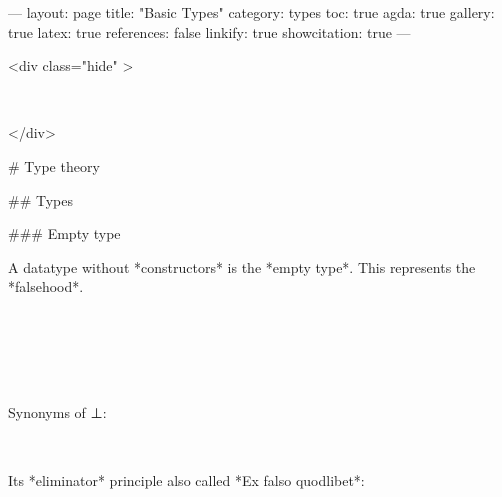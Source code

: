 ---
layout: page
title: "Basic Types"
category: types
toc: true
agda: true
gallery: true
latex: true
references: false
linkify: true
showcitation: true
---

<div class="hide" >
\begin{code}%
\>[0]\AgdaSymbol{\{-\#}\AgdaSpace{}%
\AgdaSpace{}%
\AgdaSpace{}%
\AgdaSymbol{\#-\}}\<%
\\
\>[0]\AgdaSpace{}%
\AgdaSpace{}%
\AgdaSpace{}%
\<%
\end{code}
</div>

# Type theory

## Types

### Empty type

A datatype without *constructors* is the *empty type*. This represents  the *falsehood*.

\begin{code}%
\>[0]\<%
\\
\>[0][@{}l@{\AgdaIndent{0}}]%
\>[2]%
\>[6I]\AgdaSymbol{\{}\AgdaSymbol{\}}\<%
\\
\>[.][@{}l@{}]\<[6I]%
\>[4]\AgdaSymbol{:}\AgdaSpace{}%
\AgdaSpace{}%
\<%
\\
%
\>[2]\<%
\\
%
\>[2]\<%
\end{code}

Synonyms of ⊥:

\begin{code}%
\>[0]\AgdaSpace{}%
\AgdaSymbol{=}\AgdaSpace{}%
\<%
\\
\>[0]%
\>[6]\AgdaSymbol{=}\AgdaSpace{}%
\<%
\end{code}

Its *eliminator* principle also called *Ex falso quodlibet*:

\begin{code}%
\>[0]\<%
\\
\>[0][@{}l@{\AgdaIndent{0}}]%
\>[2]\AgdaSymbol{:}\AgdaSpace{}%
\AgdaSpace{}%
\AgdaSymbol{\{}\AgdaSpace{}%
\AgdaSymbol{:}\AgdaSpace{}%
\AgdaSpace{}%
\AgdaSymbol{\}}\<%
\\
%
\>[2]\AgdaSpace{}%
\AgdaSpace{}%
\AgdaSymbol{\{}\AgdaSymbol{\}}\<%
\\
%
\>[2]\AgdaComment{--------}\<%
\\
%
\>[2]\AgdaSpace{}%
\<%
\\
%
\\[\AgdaEmptyExtraSkip]%
\>[0]\AgdaSpace{}%
\AgdaSymbol{()}\<%
\end{code}

